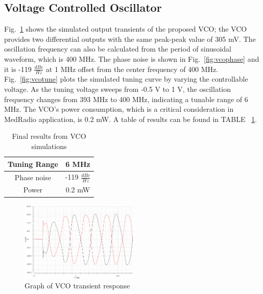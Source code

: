 \subsection{Voltage Controlled Oscillator}
Fig.~\ref{fig:vcotrans} shows the simulated output transients of the proposed VCO; the VCO provides two differential outputs with the same peak-peak value of 305 mV. The oscillation frequency can also be calculated from the period of sinusoidal waveform, which is 400 MHz. The phase noise is shown in Fig.~\ref{fig:vcophase} and it is -119 $\frac{dBc}{Hz}$ at 1 MHz offset from the center frequency of 400 MHz. Fig.~\ref{fig:vcotune} plots the simulated tuning curve by varying the controllable voltage. As the tuning voltage sweeps from -0.5 V to 1 V, the oscillation frequency changes from 393 MHz to 400 MHz, indicating a tunable range of 6 MHz. The VCO’s power consumption, which is a critical consideration in MedRadio application, is 0.2 mW. A table of results can be found in TABLE ~\ref{tab:vcoresults}.

\begin{table}[h]
\begin{center}
	\begin{tabular}{ c | c  }

  		Tuning Range &  6 MHz \\ \hline
  		Phase noise &  -119 $\frac{dBc}{Hz}$ \\ \hline
		Power & 0.2 mW \\ 

	\end{tabular}

\end{center}
\caption{Final results from VCO simulations}
\label{tab:vcoresults}
\end{table}

\begin{figure}[h]
   \centering
    \includegraphics[width=0.5\textwidth]{figures/VCOTrans.png}
    \caption{Graph of VCO transient response}
    \label{fig:vcotrans}
\end{figure}

